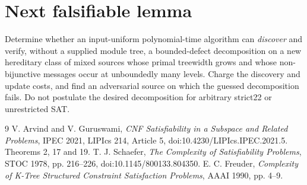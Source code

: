 \documentclass[10pt]{article}
\begin{document}
\section{Next falsifiable lemma}
Determine whether an input-uniform polynomial-time algorithm can \emph{discover} and verify, without a supplied module tree, a bounded-defect decomposition on a new hereditary class of mixed sources whose primal treewidth grows and whose non-bijunctive messages occur at unboundedly many levels. Charge the discovery and update costs, and find an adversarial source on which the guessed decomposition fails. Do not postulate the desired decomposition for arbitrary strict22 or unrestricted SAT.
\begin{thebibliography}{9}
 V. Arvind and V. Guruswami, \emph{CNF Satisfiability in a Subspace and Related Problems}, IPEC 2021, LIPIcs 214, Article 5, doi:10.4230/LIPIcs.IPEC.2021.5. Theorems 2, 17 and 19.
 T. J. Schaefer, \emph{The Complexity of Satisfiability Problems}, STOC 1978, pp. 216--226, doi:10.1145/800133.804350.
 E. C. Freuder, \emph{Complexity of K-Tree Structured Constraint Satisfaction Problems}, AAAI 1990, pp. 4--9.
\end{thebibliography}
\end{document}
